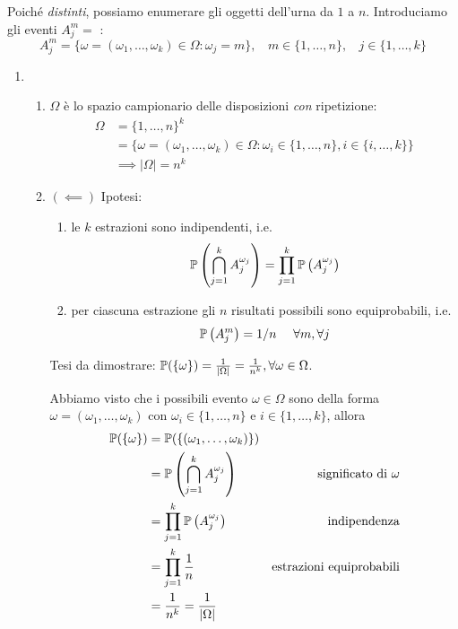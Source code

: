 Poiché \textit{distinti}, possiamo enumerare gli oggetti dell'urna da $1$ a $n$. Introduciamo gli eventi $A_{j}^{m} =$ :
\begin{equation*}
	A_{j}^{m} =\{\omega =(\omega _{1} ,\dots ,\omega _{k}) \in \Omega :\omega _{j} =m\} ,\ \ \ \ m\in \{1,\dots,n\} ,\ \ \ \ j\in \{1,\dots,k\}
\end{equation*}
\begin{enumerate}
	\item 
	\begin{enumerate}
		\item $\Omega $ è lo spazio campionario delle disposizioni \textit{con} ripetizione:
		\begin{align*}
			\Omega  & =\{1,\dots,n\}^{k}\\
			 & =\{\omega =(\omega _{1} ,\dots ,\omega _{k}) \in \Omega :\omega _{i} \in \{1,\dots,n\} ,i\in \{i,\dots,k\}\}\\
			 & \implies | \Omega | =n^{k}
		\end{align*}
		\item $(\impliedby)$ Ipotesi:
		\begin{enumerate}
			\item le $k$ estrazioni sono indipendenti, i.e.
			\begin{equation*}
				\mathbb{P}\left(\bigcap _{j=1}^{k} A_{j}^{\omega _{j}}\right) =\prod _{j=1}^{k}\mathbb{P}\left(A_{j}^{\omega _{j}}\right)
			\end{equation*}
			\item per ciascuna estrazione gli $n$ risultati possibili sono equiprobabili, i.e.
			\begin{equation*}
				\mathbb{P}\left(A_{j}^{m}\right) =1/n\ \ \ \ \forall m,\forall j
			\end{equation*}
		\end{enumerate}
		Tesi da dimostrare: $\mathbb{P}(\{\omega \}) =\frac{1}{| \Omega | } =\frac{1}{n^{k}} ,\forall \omega \in \Omega $.

		Abbiamo visto che i possibili evento $\omega \in \Omega $ sono della forma $\omega =(\omega _{1} ,\dots ,\omega _{k})$ con $\omega _{i} \in \{1,\dots,n\}$ e $i\in \{1,\dots,k\}$, allora
		\begin{align*}
			\mathbb{P}(\{\omega \}) & =\mathbb{P}(\{(\omega _{1} ,\dots ,\omega _{k})\}) & \\
			 & =\mathbb{P}\left(\bigcap _{j=1}^{k} A_{j}^{\omega _{j}}\right) & \text{significato di} \ \omega \\
			 & =\prod _{j=1}^{k}\mathbb{P}\left(A_{j}^{\omega _{j}}\right) & \text{indipendenza}\\
			 & =\prod _{j=1}^{k}\frac{1}{n} & \text{estrazioni equiprobabili}\\
			 & =\frac{1}{n^{k}} =\frac{1}{| \Omega | } & 
		\end{align*}


\end{enumerate}
\end{enumerate}
